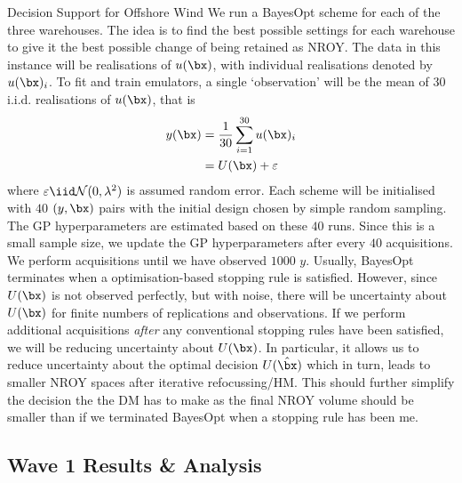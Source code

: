 \begin{chapter}{Decision Support for Offshore Wind \label{Ch:ds-for-ow}}
We run a BayesOpt scheme for each of the three warehouses. The idea is to find the best possible settings for each warehouse to give it the best possible change of being retained as NROY. The data in this instance will be realisations of $u(\bx)$, with individual realisations denoted by $u(\bx)_i$. To fit and train emulators, a single `observation' will be the mean of $30$ i.i.d. realisations of $u(\bx)$, that is
\begin{align}
  y(\bx) &= \frac{1}{30} \sum_{i = 1}^{30} u(\bx)_i\\
      & = U(\bx) + \varepsilon
\end{align}
where $\varepsilon \iid \mathcal{N}(0, \lambda^2)$ is assumed random error.
 Each scheme will be initialised with $40$ $(y, \bx)$ pairs with the initial design chosen by simple random sampling. The GP hyperparameters are estimated based on these $40$ runs. Since this is a small sample size, we update the GP hyperparameters after every $40$ acquisitions. We perform acquisitions until we have observed $1000$ $y$. Usually, BayesOpt terminates when a optimisation-based stopping rule is satisfied. However, since $U(\bx)$ is not observed perfectly, but with noise, there will be uncertainty about $U(\bx)$ for finite numbers of replications and observations. If we perform additional acquisitions \textit{after} any conventional stopping rules have been satisfied, we will be reducing uncertainty about $U(\bx)$. In particular, it allows us to reduce uncertainty about the optimal decision $U(\hat{\bx})$ which in turn, leads to smaller NROY spaces after iterative refocussing/HM. This should further simplify the decision the the DM has to make as the final NROY volume should be smaller than if we terminated BayesOpt when a stopping rule has been me.
 \subsection{Wave 1 Results \& Analysis}


\end{chapter}
